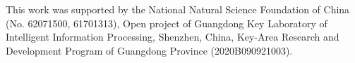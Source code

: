 \documentclass{svjour3}                     %
\begin{document}
\begin{acknowledgements}
This work was supported by the National Natural Science Foundation of China (No. 62071500, 61701313), Open project of Guangdong Key
Laboratory of Intelligent Information Processing, Shenzhen, China,
Key-Area Research and Development Program of Guangdong
Province (2020B090921003).
\end{acknowledgements}

%
%


\end{document}
